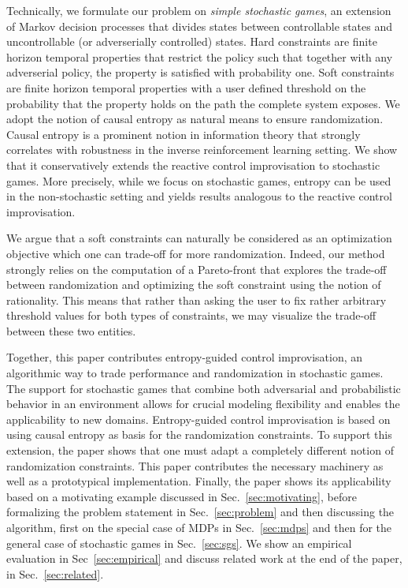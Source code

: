 Technically, we formulate our problem on \emph{simple stochastic games}, an extension of Markov decision processes that divides states between controllable states and uncontrollable (or adverserially controlled) states. Hard constraints are finite horizon temporal properties that restrict the policy such that together with any adverserial policy, the property is satisfied with probability one. Soft constraints are finite horizon temporal properties with a user defined threshold on the probability that the property holds on the path the complete system exposes. 
We adopt the notion of causal entropy as natural means to ensure randomization. Causal entropy is a prominent notion in information theory that strongly correlates with robustness in the inverse reinforcement learning setting. We show that it conservatively extends the reactive control improvisation to stochastic games. More precisely,  while we focus on stochastic games, entropy can be used in the non-stochastic setting and yields results analogous to the reactive control improvisation. 

We argue that a soft constraints can naturally be considered as an optimization objective which one can trade-off for more randomization. 
Indeed, our method strongly relies on the computation of a Pareto-front that explores the trade-off between randomization and optimizing the soft constraint using the notion of rationality. This means that rather than asking the user to  fix rather arbitrary threshold values for both types of constraints, we may visualize the trade-off between these two entities.  

Together, this paper contributes entropy-guided control improvisation, an algorithmic way to trade performance and randomization in stochastic games. 
The support for stochastic games that combine both adversarial and probabilistic behavior in an environment allows for crucial modeling flexibility and enables the applicability to new domains. 
Entropy-guided control improvisation is based on using causal entropy as basis for the randomization constraints.
To support this extension, the paper shows that one must adapt a completely different notion of randomization constraints. This paper contributes the necessary machinery as well as a prototypical implementation.
Finally, the paper shows its applicability based on a motivating example discussed in Sec.~\ref{sec:motivating}, before formalizing the problem statement in Sec.~\ref{sec:problem} and then discussing the algorithm, first on the special case of MDPs in Sec.~\ref{sec:mdps} and then for the general case of stochastic games in Sec.~\ref{sec:sgs}. 
We show an empirical evaluation in Sec~\ref{sec:empirical} and discuss related work at the end of the paper, in Sec.~\ref{sec:related}.


